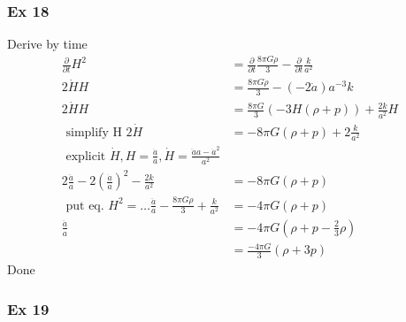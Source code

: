 \subsubsection{Ex 18}
Derive by time
\begin{align*}
	\frac{\partial }{\partial t}  H^{2} &= \frac{\partial }{\partial t}  \frac{8\pi G \rho }{3} - \frac{\partial }{\partial t}  \frac{k}{a^{2}}\\
2 \dot{H}H &= \frac{8\pi G \dot{\rho }}{3} - \left( -2\dot{a} \right)a^{-3}k\\
 2\dot{H}H &= \frac{8\pi G}{3}\left( -3H\left( \rho +p \right) \right) + \frac{2k}{a^{2}}H\\
 \text{ simplify H }
 2\dot{H} &= -8 \pi G \left( \rho +p \right) + 2 \frac{k}{a^{2}}\\
 \text{ explicit } \dot{H}, H = \frac{\dot{a}}{a}, \dot{H} = \frac{\ddot{a}a - \dot{a}^{2}}{a^{2}}\\
 2 \frac{\ddot{a}}{a} - 2 \left( \frac{\dot{a}}{a} \right)^{2} - \frac{2k}{a^{2}} &= -8\pi G\left( \rho +p \right)\\
 \text{ put eq.  } H^{2} = \ldots 
 \frac{\ddot{a}}{a} - \frac{8\pi G\rho }{3}+ \frac{k}{a^{2}} &= -4\pi G\left( \rho +p \right)\\
 \frac{\ddot{a}}{a} &= -4\pi G \left( \rho +p-\frac{2}{3}\rho  \right)\\
		    &= \frac{-4\pi G}{3}\left( \rho +3p \right)
\end{align*}
Done

\subsubsection{Ex 19}





















